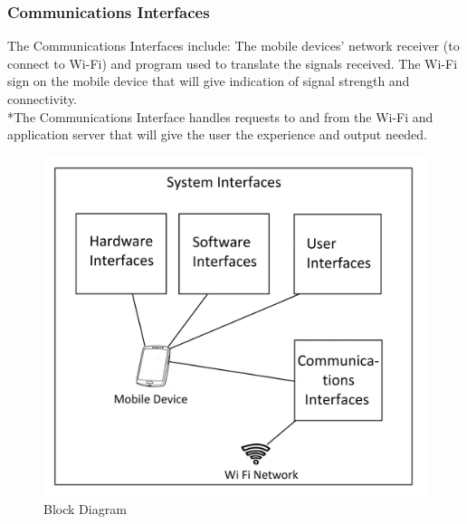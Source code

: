 \documentclass[12pt]{article}
\begin{document}
\subsubsection{Communications Interfaces}
The Communications Interfaces include:
The mobile devices’ network receiver (to connect to Wi-Fi) and program used to translate the signals received. 
The Wi-Fi sign on the mobile device that will give indication of signal strength and connectivity.\\
*The Communications Interface handles requests to and from the Wi-Fi and application server that will give the user the experience and output needed.


\begin{figure}[h!]
\centering
\includegraphics[scale=0.1]{BLockDiagram.jpg}
\caption{Block Diagram}
\label{fig:block diagram}
\end{figure}
\end{document}
